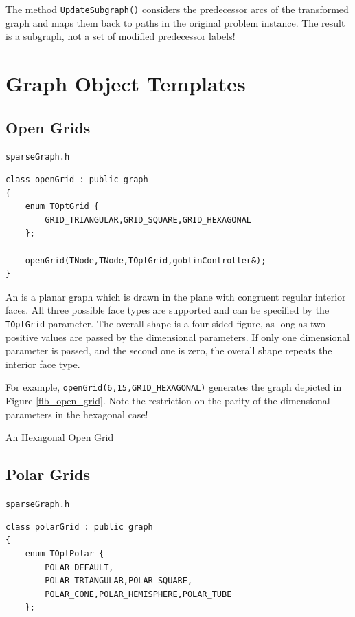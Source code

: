 \documentclass[a4paper,11pt,twoside]{book}
\begin{document}
\begin{multicols}{2}
The method \verb/UpdateSubgraph()/ considers the predecessor arcs of the
transformed graph and maps them back to paths in the original problem
instance. The result is a subgraph, not a set of modified predecessor labels!



\section{Graph Object Templates}

\subsection{Open Grids}
\label{slb_open_grid}
\myinclude\verb/sparseGraph.h/
\begin{mymethods}
\begin{verbatim}
class openGrid : public graph
{
    enum TOptGrid {
        GRID_TRIANGULAR,GRID_SQUARE,GRID_HEXAGONAL
    };

    openGrid(TNode,TNode,TOptGrid,goblinController&);
}
\end{verbatim}
\end{mymethods}
An  is a planar graph which is drawn in the plane with congruent
regular interior faces. All three possible face types are supported and can be
specified by the \verb/TOptGrid/ parameter. The overall shape is a four-sided
figure, as long as two positive values are passed by the dimensional parameters.
If only one dimensional parameter is passed, and the second one is zero, the
overall shape repeats the interior face type.

For example, \verb/openGrid(6,15,GRID_HEXAGONAL)/ generates the graph depicted
in Figure \ref{flb_open_grid}. Note the restriction on the parity of the
dimensional parameters in the hexagonal case!

\bigskip
\begin{figurehere}
\begin{center}
\epsfxsize=8cm
\vspace{0.5cm}
\caption{\label{flb_open_grid}An Hexagonal Open Grid}
\end{center}
\end{figurehere}


\subsection{Polar Grids}
\label{slb_polar_grid}
\myinclude\verb/sparseGraph.h/
\begin{mymethods}
\begin{verbatim}
class polarGrid : public graph
{
    enum TOptPolar {
        POLAR_DEFAULT,
        POLAR_TRIANGULAR,POLAR_SQUARE,
        POLAR_CONE,POLAR_HEMISPHERE,POLAR_TUBE
    };


\end{verbatim}
\end{mymethods}
\end{multicols}
\end{document}

